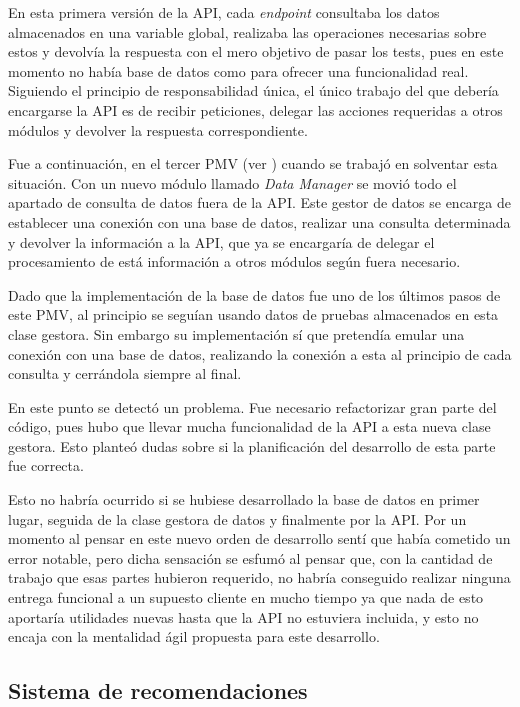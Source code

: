 En esta primera versión de la API, cada \textit{endpoint} consultaba los datos almacenados en una variable global, realizaba las operaciones necesarias sobre estos y devolvía la respuesta con el mero objetivo de pasar los tests, pues en este momento no había base de datos como para ofrecer una funcionalidad real. Siguiendo el principio de responsabilidad única, el único trabajo del que debería encargarse la API es de recibir peticiones, delegar las acciones requeridas a otros módulos y devolver la respuesta correspondiente.

Fue a continuación, en el tercer PMV (ver ) cuando se trabajó en solventar esta situación. Con un nuevo módulo llamado \textit{Data Manager} se movió todo el apartado de consulta de datos fuera de la API. Este gestor de datos se encarga de establecer una conexión con una base de datos, realizar una consulta determinada y devolver la información a la API, que ya se encargaría de delegar el procesamiento de está información a otros módulos según fuera necesario.

Dado que la implementación de la base de datos fue uno de los últimos pasos de este PMV, al principio se seguían usando datos de pruebas almacenados en esta clase gestora. Sin embargo su implementación sí que pretendía emular una conexión con una base de datos, realizando la conexión a esta al principio de cada consulta y cerrándola siempre al final.

En este punto se detectó un problema. Fue necesario refactorizar gran parte del código, pues hubo que llevar mucha funcionalidad de la API a esta nueva clase gestora. Esto planteó dudas sobre si la planificación del desarrollo de esta parte fue correcta.

Esto no habría ocurrido si se hubiese desarrollado la base de datos en primer lugar, seguida de la clase gestora de datos y finalmente por la API. Por un momento al pensar en este nuevo orden de desarrollo sentí que había cometido un error notable, pero dicha sensación se esfumó al pensar que, con la cantidad de trabajo que esas partes hubieron requerido, no habría conseguido realizar ninguna entrega funcional a un supuesto cliente en mucho tiempo ya que nada de esto aportaría utilidades nuevas hasta que la API no estuviera incluida, y esto no encaja con la mentalidad ágil propuesta para este desarrollo.

\subsection{Sistema de recomendaciones}

